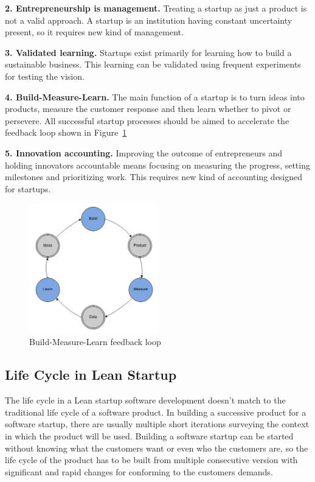 \textbf{2. Entrepreneurship is management.} Treating a startup as just a product is not a valid approach. A startup is an institution having constant uncertainty present, so it requires new kind of management.

\textbf{3. Validated learning.} Startups exist primarily for learning how to build a sustainable business. This learning can be validated using frequent experiments for testing the vision.

\textbf{4. Build-Measure-Learn.} The main function of a startup is to turn ideas into products, measure the customer response and then learn whether to pivot or persevere. All successful startup processes should be aimed to accelerate the feedback loop shown in Figure~\ref{fig:feedback-loop}

\textbf{5. Innovation accounting.} Improving the outcome of entrepreneurs and holding innovators accountable means focusing on measuring the progress, setting milestones and prioritizing work. This requires new kind of accounting designed for startups.

\begin{figure}[t]
\begin{center}
\includegraphics[width=0.5\textwidth]{image/feedback-loop.png}
\end{center}
\caption{Build-Measure-Learn feedback loop}
\label{fig:feedback-loop}
\end{figure}




 \subsection{Life Cycle in Lean Startup}

 
 The life cycle in a Lean startup software development doesn't match to the traditional life cycle of a software product. In building a successive product for a software startup, there are usually multiple short iterations surveying the context in which the product will be used. Building a software startup can be started without knowing what the customers want or even who the customers are, so the life cycle of the product has to be built from multiple consecutive version with significant and rapid changes for conforming to the customers demands.~\cite{ries2011lean}

